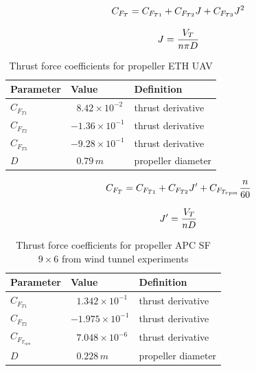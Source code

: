 \begin{equation}{\label{eqn:thrustETHcraft}}
C_{F_T} = C_{F_{T1}} + C_{F_{T2}} J + C_{F_{T3}} J^2 
\end{equation}

\begin{equation}{\label{eqn:advRatETHcraft}}
J = \frac{V_T}{n \pi D}
\end{equation}

\begin{table}
\label{arm:ETHcraft}
\caption{Thrust force coefficients for propeller ETH UAV \cite{ducard2009fault}}
\label{arm:thrustForce}
\begin{center}
\begin{tabular}{ ||p{3cm}|p{3cm}|p{4cm}||}\hline
\textbf{Parameter} & \textbf{Value} & \textbf{Definition} \\\hline
$C_{F_{T1}} $                 & $\ \ \, 8.42 \times 10^{-2}$	   & thrust derivative \\\hline
$C_{F_{T2}} $                 & $-1.36 \times 10^{-1}$	           & thrust derivative \\\hline
$C_{F_{T3}} $                 & $-9.28 \times 10^{-1}$                 & thrust derivative \\\hline
$D$                                 & $\ \ \, 0.79 \, m$                           & propeller diameter \\\hline
\end{tabular}
\end{center}
\end{table}

\begin{equation}{\label{eqn:thrustCoefMAKO}}
C_{F_T} = C_{F_{T1}} + C_{F_{T2}} J^\prime + C_{F_{T_{rpm}}} \frac{n}{60} 
\end{equation}

\begin{equation}{\label{eqn:advRatMAKO}}
J^\prime = \frac{V_T}{n D}
\end{equation}

\begin{table}
\label{arm:MAKO}
\caption{Thrust force coefficients for propeller APC SF $9 \times 6$ from wind tunnel experiments \cite{bronz2017flight}}
\label{arm:thrustForce}
\begin{center}
\begin{tabular}{ ||p{3cm}|p{3cm}|p{4cm}||}\hline
\textbf{Parameter} & \textbf{Value} & \textbf{Definition} \\\hline
$C_{F_{T1}}$                   & $\ \ \, 1.342 \times 10^{-1}$	   & thrust derivative \\\hline
$C_{F_{T2}}$                 & $-1.975 \times 10^{-1}$	          & thrust derivative \\\hline
$C_{F_{T_{rpm}}}  $           & $\ \ \, 7.048 \times 10^{-6}$    & thrust derivative \\\hline
$D$                              & $\ \ \, 0.228 \, m$                          & propeller diameter \\\hline
\end{tabular}
\end{center}
\end{table}

